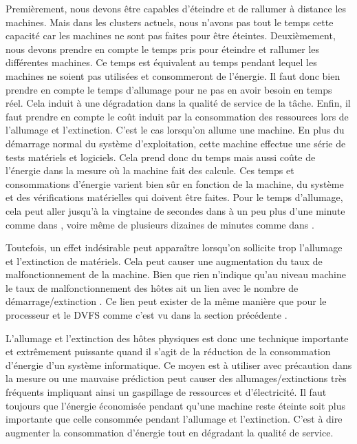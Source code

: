 \begin{onehalfspace}
Premièrement, nous devons être capables d’éteindre et de rallumer à distance les machines. Mais dans les clusters actuels, nous n’avons pas tout le temps cette capacité car les machines ne sont pas faites pour être éteintes. Deuxièmement, nous devons prendre en compte le temps pris pour éteindre et rallumer les différentes machines. Ce temps est équivalent au  temps pendant lequel les machines ne soient pas utilisées et consommeront de l’énergie. Il faut donc bien prendre en compte le temps d’allumage pour ne pas en avoir besoin en temps réel. Cela induit à une dégradation dans la qualité de service de la tâche. Enfin, il faut prendre en compte le coût induit par la consommation des ressources lors de l’allumage et l’extinction. C’est le cas lorsqu'on allume une machine. En plus du démarrage normal du système d’exploitation, cette machine  effectue une série de tests matériels et logiciels. Cela prend donc du temps mais aussi coûte de l’énergie dans la mesure où la machine fait des calcule. Ces temps et consommations d’énergie varient bien sûr en fonction de la machine, du système et des vérifications matérielles qui doivent être faites. Pour le temps d’allumage, cela peut aller jusqu’à la vingtaine de secondes dans \cite{ref19} à un peu plus d’une minute comme dans \cite{ref17}, voire même de plusieurs dizaines de minutes comme dans \cite{ref20}. \medskip


Toutefois, un effet indésirable peut apparaître lorsqu'on sollicite trop l'allumage et
l'extinction de matériels. Cela peut causer une augmentation du taux de malfonctionnement de
la machine. Bien que rien n'indique qu'au niveau machine le taux de malfonctionnement des hôtes ait
un lien avec le nombre de démarrage/extinction \cite{ref20}. Ce lien peut exister de la même manière  que pour le processeur et le DVFS comme c'est vu dans la section précédente \cite{ref14}.\medskip

L'allumage et l'extinction des hôtes physiques est donc une technique importante et extrêmement
puissante quand il s’agit de la réduction de  la consommation d’énergie d’un système informatique.
Ce moyen est  à utiliser avec précaution dans la mesure ou une mauvaise prédiction peut
causer des allumages/extinctions très fréquents  impliquant ainsi un gaspillage de ressources
et d’électricité. Il faut toujours que l'énergie économisée pendant qu'une machine reste éteinte soit plus
importante que celle consommée pendant l'allumage et l'extinction. C'est à dire augmenter la consommation d'énergie tout en dégradant la qualité de service.
\end{onehalfspace}

